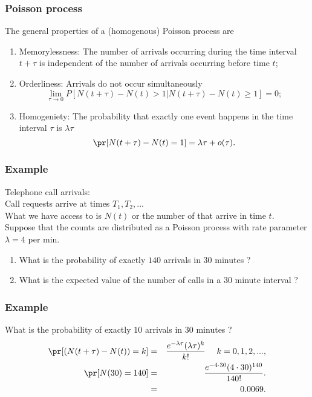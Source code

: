 \begin{frame}[fragile]\frametitle{Poisson process}

The general properties of a (homogenous) Poisson process are

\begin{enumerate}

\item Memorylessness:  The number of arrivals occurring during the time
  interval $t+\tau$ is independent of the number of arrivals occurring 
  before time $t$; 

\item Orderliness: Arrivals do not occur simultaneously
$$\lim_{\tau \rightarrow 0} P[N(t+\tau) - N(t) > 1 | N(t+\tau) -N(t)
\geq 1] = 0;$$  

\item Homogeniety: The probability that exactly one event happens
in the time interval $\tau$ is $\lambda \tau$  
$$\pr[N(t+\tau)-N(t) = 1] = \lambda \tau +o(\tau).$$ 

\end{enumerate}

\end{frame}




\begin{frame}[fragile]\frametitle{Example}

Telephone call arrivals:\\
Call requests arrive at times $T_1,T_2,...$ \\
What we have access to is $N(t)$ or the number of
that arrive in time $t$. \\ 
Suppose that the counts are distributed as a Poisson
process with rate parameter $\lambda=4$ per min. \\  

\begin{enumerate}
\item What is the probability of exactly $140$ arrivals
in $30$ minutes ? 

\item What is the expected value of the number of calls
in a $30$ minute interval ? 

\end{enumerate}

\end{frame}




\begin{frame}[fragile]\frametitle{Example}

What is the probability of exactly $10$ arrivals
in $30$ minutes ? \\ 

\begin{eqnarray*}
\pr[(N(t+\tau)-N(t)) = k] &=& \frac{e^{-\lambda \tau} (\lambda \tau)^k}{k!} \, \, \, \, \, \, \, \, k=0,1,2,..., \\
\pr[N(30) = 140] & = & \frac{e^{-4 \cdot 30}(4 \cdot  30)^{140}}{140!}.\\
& = & 0.0069.
\end{eqnarray*}

\end{frame}



